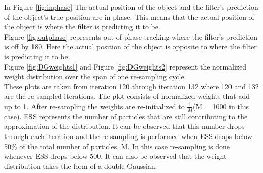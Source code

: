 \documentclass[12pt]{article}
\begin{document}
In Figure \ref{fig:inphase} The actual position of the object and the filter's prediction of the object's true position are in-phase. This means that the actual position of the object is where the filter is predicting it to be.\\

Figure \ref{fig:outphase} represents out-of-phase tracking where the filter's prediction is off by 180\textdegree. Here the actual position of the object is opposite to where the filter is predicting it to be. \\

Figure \ref{fig:DGweights1} and Figure \ref{fig:DGweights2} represent the normalized weight distribution over the span of one re-sampling cycle. \\
These plots are taken from iteration 120 through iteration 132 where 120 and 132 are the re-sampled iterations. The plot consists of normalized weights that add up to 1. After re-sampling the weights are re-initialized to $\frac{1}{M}$(M = 1000 in this case). ESS represents the number of particles that are still contributing to the approximation of the distribution. It can be observed that this number drops through each iteration and the re-sampling is performed when ESS drops below 50\% of the total number of particles, M. In this case re-sampling is done whenever ESS drops below 500. It can also be observed that the weight distribution takes the form of a double Gaussian.  
\end{document}
